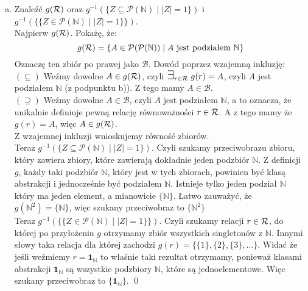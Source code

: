 \documentclass[10pt]{article}
\newcommand{\N}{\mathbb{N}}
\newcommand{\Pows}{\mathcal{P}}
\newcommand{\Exists}{{\Large\mbox{$\exists$}}}
\begin{document}
\begin{enumerate}[a)]
    \item Znaleźć $g(\mathcal{R})$ oraz $g^{-1}(\{Z \subseteq \Pows(\N) \mid |Z| = 1\})$ i $g^{-1}(\{\{Z \in \Pows(\N) \mid |Z| = 1\}\})$. \\[10pt]
    Najpierw $g(\mathcal{R})$. Pokażę, że:
    $$g(\Rel) = \{A \in \Pows(\Pows(\N)) \mid A \text{ jest podziałem } \N\}$$
    Oznaczę ten zbiór po prawej jako $\mathcal{B}$. Dowód poprzez wzajemną inkluzję: \\[5pt]
    $(\subseteq)$ Weźmy dowolne $A \in g(\mathcal{R})$, czyli $\Exists_{r\in \Rel} \; g(r) = A$, czyli $A$ jest podziałem $\N$ (z podpunktu b)). Z tego mamy $A \in \mathcal{B}$. \\[5pt]
    $(\supseteq)$ Weźmy dowolne $A \in \mathcal{B}$, czyli $A$ jest podziałem $\N$, a to oznacza, że unikalnie definiuje pewną relację równoważności $r \in \mathcal{R}$. A z tego mamy że $g(r) = A$, więc $A \in g(\mathcal{R})$. \\[5pt]
    Z wzajemnej inkluzji wnioskujemy równość zbiorów. \\[10pt]
    Teraz $g^{-1}(\{Z \subseteq \Pows(\N) \mid |Z| = 1\})$. Czyli szukamy przeciwobrazu zbioru, który zawiera zbiory, które zawierają dokładnie jeden podzbiór $\N$. Z definicji $g$, każdy taki podzbiór $\N$, który jest w tych zbiorach, powinien być klasą abstrakcji i jednocześnie być podziałem $\N$. Istnieje tylko jeden podział $\N$ który ma jeden element, a mianowicie $\{\N\}$. Łatwo zauważyć, że $g(\N^2) = \{\N\}$, więc szukany przeciwobraz to $\{\N^2\}$ \\[10pt]
    Teraz  $g^{-1}(\{\{Z \in \Pows(\N) \mid |Z| = 1\}\})$. Czyli szukamy relacji $r \in \mathcal{R}$, do której po przyłożeniu $g$ otrzymamy zbiór wszystkich singletonów z $\N$. Innymi słowy taka relacja dla której zachodzi $g(r) = \{ \{1\}, \{2\}, \{3\}, \ldots \}$. Widać że jeśli weźmiemy $r = \mathbf{1}_\N$ to właśnie taki rezultat otrzymamy, ponieważ klasami abstrakcji $\mathbf{1}_\N$ są wszystkie podzbiory $\N$, które są jednoelementowe. Więc szukany przeciwobraz to $\{\mathbf{1}_\N\}$. \qed
\end{enumerate}

\vspace{20pt}
\end{document}
